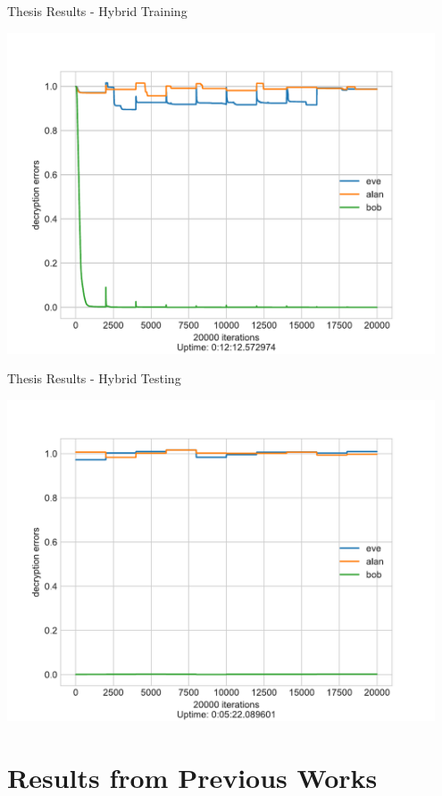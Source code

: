 \documentclass[a4paper, 12pt]{report}
\begin{document}
\begin{blockfigure}{Thesis Results - Hybrid Training}
	\begin{center}
		\includegraphics[width = 0.95\textwidth]{neurencoder-hybrid-training}
	\end{center}
\end{blockfigure}
\begin{blockfigure}{Thesis Results - Hybrid Testing}
	\begin{center}
		\includegraphics[width = 0.95\textwidth]{neurencoder-hybrid-testing}
	\end{center}
\end{blockfigure}
\newpage
\section{\textbf{Results from Previous Works}}
\end{document}
